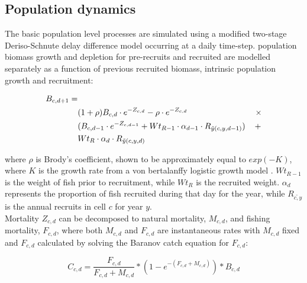 \documentclass[review]{elsarticle}
\begin{document}
\subsection{Population dynamics}

The basic population level processes are simulated using a modified two-stage
Deriso-Schnute delay difference model \citep{Deriso1980, Schnute1985,
	Dichmont2003} occurring at a daily time-step. 
 population
biomass growth and depletion for pre-recruits and 
recruited   are modelled
separately as a function of previous recruited biomass, intrinsic population
growth and recruitment:

\begin{equation*}
	\begin{split}
	B_{c,d+1} = &\\
	& (1 + \rho) B_{c,d} \cdot e^{-Z_{c,d}} - \rho \cdot e^{-Z_{c,d}} \hspace{2.9cm}
	\times \\  
	& (B_{c,d-1} \cdot e^{-Z_{c,d-1}} + Wt_{R-1} \cdot \alpha_{d-1} \cdot
	R_{\tilde{y}(c,y,d-1)})
	\hspace{0.4cm} + \\
	& Wt_{R} \cdot \alpha_{d} \cdot R_{\tilde{y}(c,y,d)} 
	\end{split}
\end{equation*}

where $\rho$ is Brody's coefficient, shown to be approximately equal to
$exp(-K)$, where $K$ is the growth rate from a von bertalanffy logistic growth
model \citep{Schnute1985}. $Wt_{R-1}$ is the weight of fish prior to
recruitment, while $Wt_{R}$ is the recruited weight. $\alpha_{d}$ represents
the proportion of fish recruited during that day for the year, while
$R_{\tilde{c,y}}$ is the annual recruits in cell $c$ for year $y$. \\

Mortality $Z_{c,d}$ can be decomposed to natural mortality, $M_{c,d}$, and
fishing mortality, $F_{c,d}$, where both $M_{c,d}$ and $F_{c,d}$ are
instantaneous rates with $M_{c,d}$ fixed and $F_{c,d}$ calculated by solving
the Baranov catch equation \citep{Hilborn1992b} for $F_{c,d}$:

\begin{equation*}
C_{c,d} = \frac{F_{c,d}}{F_{c,d} + M_{c,d}} * (1 - e^{-(F_{c,d} + M_{c,d})}) *
B_{c,d}
\end{equation*}
\end{document}
